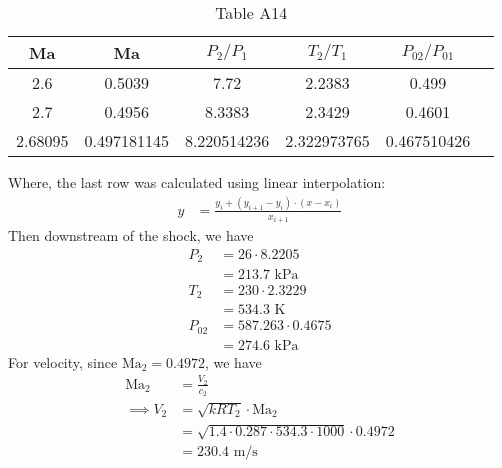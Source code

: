 \begin{table}[H]
    \centering
    \caption{Table A14}
    \begin{tabular}{cccccc}
        \toprule
        Ma & Ma & $P_2/P_1$ & $T_2/T_1$ & $P_{02}/P_{01}$ \\
        \midrule
        2.6 & 0.5039 & 7.72 & 2.2383 & 0.499 \\
        2.7 & 0.4956 & 8.3383 & 2.3429 & 0.4601 \\
        \midrule
        2.68095 & 0.497181145 & 8.220514236 & 2.322973765 & 0.467510426 \\
        \bottomrule
    \end{tabular}
\end{table}
Where, the last row was calculated using linear interpolation:
\begin{align*}
    y &= \frac{y_i + (y_{i+1} - y_i) \cdot (x - x_i)}{x_{i+1}} 
\end{align*}
Then downstream of the shock, we have
\begin{align*}
    P_2 &= 26 \cdot 8.2205 \\
    &= \boxed{213.7 \text{ kPa}} \\
    T_2 &= 230 \cdot 2.3229 \\ 
    &= \boxed{534.3 \text{ K}} \\
    P_{02} &= 587.263 \cdot 0.4675 \\
    &= \boxed{274.6 \text{ kPa}} 
\end{align*}
For velocity, since $\text{Ma}_2 = 0.4972$, we have
\begin{align*}
    \text{Ma}_2 &= \frac{V_2}{c_2} \\
    \implies V_2 &= \sqrt{kRT_2} \cdot \text{Ma}_2 \\
    &= \sqrt{1.4 \cdot 0.287 \cdot 534.3 \cdot 1000} \cdot 0.4972 \\
    &= \boxed{230.4 \text{ m/s}}
\end{align*}


    
